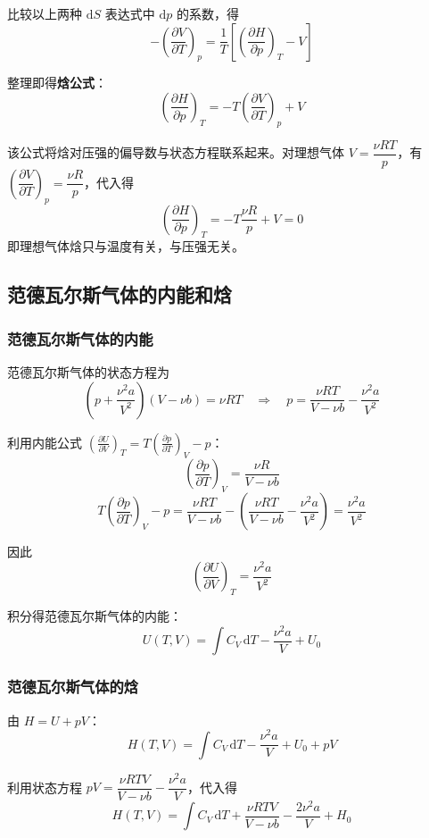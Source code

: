 \documentclass[UTF8]{ctexart}
\begin{document}
比较以上两种 $\mathrm{d}S$ 表达式中 $\mathrm{d}p$ 的系数，得
\[
-\left(\frac{\partial V}{\partial T}\right)_p
=\frac{1}{T}\left[\left(\frac{\partial H}{\partial p}\right)_T-V\right]
\]

整理即得\textbf{焓公式}：
\[
\boxed{\left(\frac{\partial H}{\partial p}\right)_T
=-T\left(\frac{\partial V}{\partial T}\right)_p+V}
\]

该公式将焓对压强的偏导数与状态方程联系起来。对理想气体 $V=\dfrac{\nu RT}{p}$，有 $\left(\dfrac{\partial V}{\partial T}\right)_p=\dfrac{\nu R}{p}$，代入得
\[
\left(\frac{\partial H}{\partial p}\right)_T
=-T\frac{\nu R}{p}+V=0
\]
即理想气体焓只与温度有关，与压强无关。

\subsection{范德瓦尔斯气体的内能和焓}

\subsubsection{范德瓦尔斯气体的内能}

范德瓦尔斯气体的状态方程为
\[
\left(p+\frac{\nu^2 a}{V^2}\right)(V-\nu b)=\nu RT
\quad\Longrightarrow\quad
p=\frac{\nu RT}{V-\nu b}-\frac{\nu^2 a}{V^2}
\]

利用内能公式 $\displaystyle\left(\frac{\partial U}{\partial V}\right)_T=T\left(\frac{\partial p}{\partial T}\right)_V-p$：
\[
\left(\frac{\partial p}{\partial T}\right)_V=\frac{\nu R}{V-\nu b}
\]
\[
T\left(\frac{\partial p}{\partial T}\right)_V-p
=\frac{\nu RT}{V-\nu b}-\left(\frac{\nu RT}{V-\nu b}-\frac{\nu^2 a}{V^2}\right)
=\frac{\nu^2 a}{V^2}
\]

因此
\[
\left(\frac{\partial U}{\partial V}\right)_T=\frac{\nu^2 a}{V^2}
\]

积分得范德瓦尔斯气体的内能：
\[
\boxed{U(T,V)=\int C_V\,\mathrm{d}T-\frac{\nu^2 a}{V}+U_0}
\]

\subsubsection{范德瓦尔斯气体的焓}

由 $H=U+pV$：
\[
H(T,V)=\int C_V\,\mathrm{d}T-\frac{\nu^2 a}{V}+U_0+pV
\]

利用状态方程 $pV=\dfrac{\nu RTV}{V-\nu b}-\dfrac{\nu^2 a}{V}$，代入得
\[
\boxed{H(T,V)=\int C_V\,\mathrm{d}T+\frac{\nu RTV}{V-\nu b}-\frac{2\nu^2 a}{V}+H_0}
\]
\end{document}
